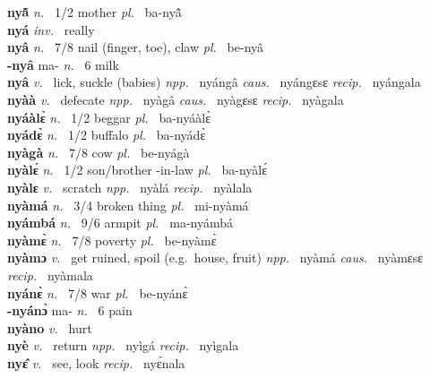 {\bfseries nyã̂}  {\itshape n.~} 1/2 mother {\itshape pl.~} ba-nyã̂    \\ 
{\bfseries nyá}  {\itshape inv.~} really    \\ 
{\bfseries nyâ}  {\itshape n.~} 7/8 nail (finger, toe), claw {\itshape pl.~} be-nyâ    \\ 
{\bfseries -nyâ} ma- {\itshape n.~} 6 milk    \\ 
{\bfseries nyâ}  {\itshape v.~} lick, suckle (babies)   {\itshape npp.~} nyángâ {\itshape caus.~} nyángɛsɛ {\itshape recip.~} nyángala  \\ 
{\bfseries nyàà}  {\itshape v.~} defecate   {\itshape npp.~} nyàgâ {\itshape caus.~} nyàgɛsɛ {\itshape recip.~} nyàgala  \\ 
{\bfseries nyáàlɛ̀}  {\itshape n.~} 1/2 beggar {\itshape pl.~} ba-nyáàlɛ̀    \\ 
{\bfseries nyádɛ̀}  {\itshape n.~} 1/2 buffalo {\itshape pl.~} ba-nyádɛ̀   \\ 
{\bfseries nyàgà}  {\itshape n.~} 7/8 cow {\itshape pl.~} be-nyágà    \\ 
{\bfseries nyàlɛ́}  {\itshape n.~} 1/2 son/brother -in-law {\itshape pl.~} ba-nyàlɛ́    \\ 
{\bfseries nyàlɛ}  {\itshape v.~} scratch   {\itshape npp.~} nyàlá {\itshape recip.~} nyàlala  \\ 
{\bfseries nyàmá}  {\itshape n.~} 3/4 broken thing {\itshape pl.~} mi-nyàmá    \\ 
{\bfseries nyámbá}  {\itshape n.~} 9/6 armpit {\itshape pl.~} ma-nyámbá    \\ 
{\bfseries nyàmɛ̀}  {\itshape n.~} 7/8 poverty {\itshape pl.~} be-nyàmɛ̀    \\ 
{\bfseries nyàmɔ}  {\itshape v.~} get ruined, spoil (e.g.\ house, fruit)   {\itshape npp.~} nyàmá {\itshape caus.~} nyàmɛsɛ  {\itshape recip.~} nyàmala  \\ 
{\bfseries nyánɛ̀}  {\itshape n.~} 7/8 war {\itshape pl.~} be-nyánɛ̀    \\ 
{\bfseries -nyánɔ̀} ma- {\itshape n.~} 6 pain    \\ 
{\bfseries nyàno}  {\itshape v.~} hurt   \\ 
{\bfseries nyè}  {\itshape v.~} return   {\itshape npp.~} nyìgá {\itshape recip.~} nyìgala  \\ 
{\bfseries nyɛ̂}  {\itshape v.~} see, look   {\itshape recip.~} nyɛ́nala  \\ 
